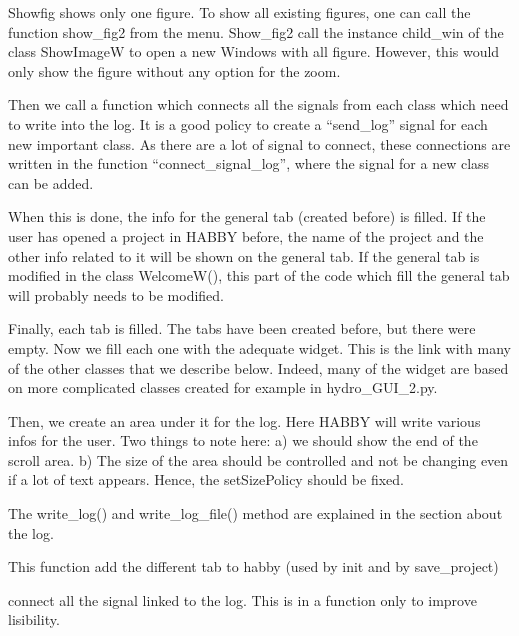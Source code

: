 \documentclass[letterpaper,10pt,english]{sphinxmanual}
\begin{document}
\begin{fulllineitems}
Showfig shows only one figure. To show all existing figures, one can call the function show\_fig2 from the menu.
Show\_fig2 call the instance child\_win of the class ShowImageW to open a new Windows with all figure. However,
this would only show the figure without any option for the zoom.

Then we call a function which connects all the signals from each class which need to write into the log. It is a good
policy to create a “send\_log” signal for each new important class. As there are a lot of signal to connect, these
connections are written in the function “connect\_signal\_log”, where the signal for a new class can be added.

When this is done, the info for the general tab (created before) is filled. If the user has opened a project in HABBY
before, the name of the project and the other info related to it will be shown on the general tab. If the general
tab is modified in the class WelcomeW(), this part of the code which fill the general tab will probably needs to
be modified.

Finally, each tab is filled. The tabs have been created before, but there were empty. Now we fill each one with the
adequate widget. This is the link with many of the other classes that we describe below. Indeed, many of the widget
are based on more complicated classes created for example in hydro\_GUI\_2.py.

Then, we create an area under it for the log. Here HABBY will write various infos for the user. Two things to note
here: a) we should show the end of the scroll area. b) The size of the area should be controlled and not be
changing even if a lot of text appears. Hence, the setSizePolicy should be fixed.

The write\_log() and write\_log\_file() method are explained in the section about the log.

\begin{fulllineitems}
\label{\detokenize{index:src_GUI.Main_windows_1.CentralW.add_all_tab}}
This function add the different tab to habby (used by init and by save\_project)

\end{fulllineitems}


\begin{fulllineitems}
\label{\detokenize{index:src_GUI.Main_windows_1.CentralW.connect_signal_log}}
connect all the signal linked to the log. This is in a function only to improve lisibility.


\end{fulllineitems}
\end{fulllineitems}
\end{document}
